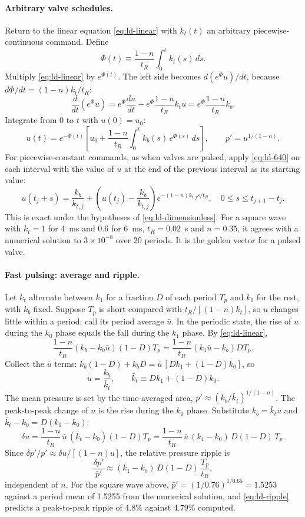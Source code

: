 \paragraph{Arbitrary valve schedules.} Return to the linear equation
\eqref{eq:ld-linear} with $k_t(t)$ an arbitrary piecewise-continuous
command. Define
\[
 \Phi(t)\equiv\frac{1-n}{t_R}\int_0^tk_t(s)\,ds .
\]
Multiply \eqref{eq:ld-linear} by $e^{\Phi(t)}$. The left side becomes
$d(e^{\Phi}u)/dt$, because $d\Phi/dt=(1-n)k_t/t_R$:
\[
 \frac{d}{dt}\left(e^{\Phi}u\right)
 =e^{\Phi}\frac{du}{dt}+e^{\Phi}\frac{1-n}{t_R}k_tu
 =e^{\Phi}\frac{1-n}{t_R}k_b .
\]
Integrate from 0 to $t$ with $u(0)=u_0$:
\begin{equation}\label{eq:ld-integrating-factor}
 u(t)=e^{-\Phi(t)}\left[u_0+\frac{1-n}{t_R}
      \int_0^tk_b(s)\,e^{\Phi(s)}\,ds\right],
 \qquad p'=u^{1/(1-n)} .
\end{equation}
For piecewise-constant commands, as when valves are pulsed, apply
\eqref{eq:ld-640} on each interval with the value of $u$ at the end of
the previous interval as its starting value:
\[
 u(t_{j}+s)=\frac{k_b}{k_{t,j}}
 +\left(u(t_j)-\frac{k_b}{k_{t,j}}\right)e^{-(1-n)k_{t,j}s/t_R},
 \quad 0\le s\le t_{j+1}-t_j .
\]
This is exact under the hypotheses of \eqref{eq:ld-dimensionless}.
For a square wave with $k_t=1$ for 4~ms and $0.6$ for 6~ms,
$t_R=0.02$~s and $n=0.35$, it agrees with a numerical solution to
$3\times10^{-8}$ over 20 periods. It is the golden vector for a pulsed
valve.

\paragraph{Fast pulsing: average and ripple.} Let $k_t$ alternate
between $k_1$ for a fraction $D$ of each period $T_p$ and $k_0$ for
the rest, with $k_b$ fixed. Suppose $T_p$ is short compared with
$t_R/[(1-n)k_t]$, so $u$ changes little within a period; call its
period average $\bar u$. In the periodic state, the rise of $u$ during
the $k_0$ phase equals the fall during the $k_1$ phase. By
\eqref{eq:ld-linear},
\[
 \frac{1-n}{t_R}(k_b-k_0\bar u)(1-D)T_p
 =\frac{1-n}{t_R}(k_1\bar u-k_b)DT_p .
\]
Collect the $\bar u$ terms:
$k_b(1-D)+k_bD=\bar u\,[Dk_1+(1-D)k_0]$, so
\[
 \bar u=\frac{k_b}{\bar k_t},\qquad
 \bar k_t\equiv Dk_1+(1-D)k_0 .
\]
The mean pressure is set by the time-averaged area,
$\bar p'\approx(k_b/\bar k_t)^{1/(1-n)}$. The peak-to-peak change of
$u$ is the rise during the $k_0$ phase. Substitute
$k_b=\bar k_t\bar u$ and $\bar k_t-k_0=D(k_1-k_0)$:
\[
 \delta u=\frac{1-n}{t_R}\,\bar u\,(\bar k_t-k_0)(1-D)T_p
 =\frac{1-n}{t_R}\,\bar u\,(k_1-k_0)\,D(1-D)\,T_p .
\]
Since $\delta p'/p'\approx\delta u/[(1-n)u]$, the relative pressure
ripple is
\begin{equation}\label{eq:ld-ripple}
 \frac{\delta p'}{\bar p'}\approx
 (k_1-k_0)\,D(1-D)\,\frac{T_p}{t_R},
\end{equation}
independent of $n$. For the square wave above,
$\bar p'=(1/0.76)^{1/0.65}=1.5253$ against a period mean of 1.5255
from the numerical solution, and \eqref{eq:ld-ripple} predicts a
peak-to-peak ripple of 4.8\% against 4.79\% computed.


